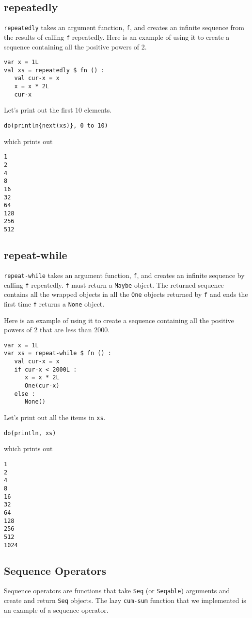 \documentclass[10pt,oneside]{book}
\begin{document}
\subsection*{repeatedly}
\texttt{\frenchspacing repeatedly} takes an argument function, \texttt{\frenchspacing f}, and creates an infinite sequence from the results of calling \texttt{\frenchspacing f} repeatedly. Here is an example of using it to create a sequence containing all the positive powers of 2. 
\begin{lstlisting}
var x = 1L
val xs = repeatedly $ fn () :
   val cur-x = x
   x = x * 2L
   cur-x
\end{lstlisting}
Let's print out the first 10 elements.
\begin{lstlisting}
do(println{next(xs)}, 0 to 10)
\end{lstlisting}
which prints out
\begin{lstlisting}
1
2
4
8
16
32
64
128
256
512
\end{lstlisting}

\subsection*{repeat-while}
\texttt{\frenchspacing repeat-while} takes an argument function, \texttt{\frenchspacing f}, and creates an infinite sequence by calling \texttt{\frenchspacing f} repeatedly. \texttt{\frenchspacing f} must return a \texttt{\frenchspacing Maybe} object. The returned sequence contains all the wrapped objects in all the \texttt{\frenchspacing One} objects returned by \texttt{\frenchspacing f} and ends the first time \texttt{\frenchspacing f} returns a \texttt{\frenchspacing None} object.

Here is an example of using it to create a sequence containing all the positive powers of 2 that are less than 2000.
\begin{lstlisting}
var x = 1L
var xs = repeat-while $ fn () :
   val cur-x = x
   if cur-x < 2000L :
      x = x * 2L
      One(cur-x)
   else :
      None()
\end{lstlisting}
Let's print out all the items in \texttt{\frenchspacing xs}.
\begin{lstlisting}
do(println, xs)
\end{lstlisting}
which prints out
\begin{lstlisting}
1
2
4
8
16
32
64
128
256
512
1024
\end{lstlisting}

\subsection*{Sequence Operators}
Sequence operators are functions that take \texttt{\frenchspacing Seq} (or \texttt{\frenchspacing Seqable}) arguments and create and return \texttt{\frenchspacing Seq} objects. The lazy \texttt{\frenchspacing cum-sum} function that we implemented is an example of a sequence operator. 
\end{document}
